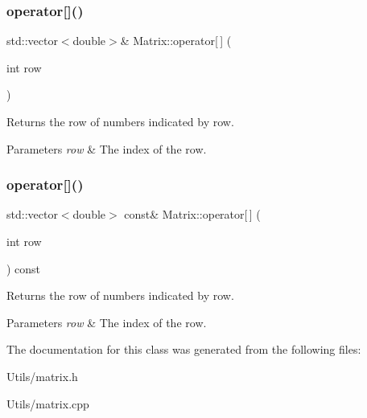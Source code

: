 \subsubsection{\texorpdfstring{operator[]()}{operator[]()}\hspace{0.1cm}{\footnotesize\ttfamily [1/2]}}
{\footnotesize\ttfamily std\+::vector$<$double$>$\& Matrix\+::operator\mbox{[}$\,$\mbox{]} (\begin{DoxyParamCaption}\item[{int}]{row }\end{DoxyParamCaption})\hspace{0.3cm}{\ttfamily [inline]}}

Returns the row of numbers indicated by {\ttfamily row}.


\begin{DoxyParams}{Parameters}
{\em row} & The index of the row. \\
\hline
\end{DoxyParams}
\mbox{\label{classMatrix_a120efaa8b3a945230e8a601927cb0e47}} 
\subsubsection{\texorpdfstring{operator[]()}{operator[]()}\hspace{0.1cm}{\footnotesize\ttfamily [2/2]}}
{\footnotesize\ttfamily std\+::vector$<$double$>$ const\& Matrix\+::operator\mbox{[}$\,$\mbox{]} (\begin{DoxyParamCaption}\item[{int}]{row }\end{DoxyParamCaption}) const\hspace{0.3cm}{\ttfamily [inline]}}

Returns the row of numbers indicated by {\ttfamily row}.


\begin{DoxyParams}{Parameters}
{\em row} & The index of the row. \\
\hline
\end{DoxyParams}


The documentation for this class was generated from the following files\+:\begin{DoxyCompactItemize}
\item 
Utils/matrix.\+h\item 
Utils/matrix.\+cpp\end{DoxyCompactItemize}
